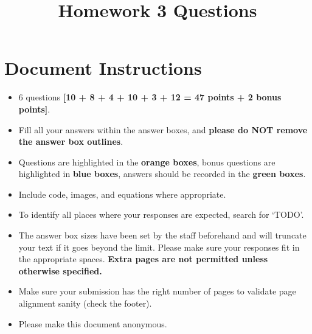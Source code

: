 \pagestyle{fancy}
\fancyhf{}


\date{}

\title{\vspace{-1cm}Homework 3 Questions}



\maketitle
\vspace{-2cm}
\thispagestyle{fancy}

\section*{ Document Instructions}
\begin{itemize}
  \item 6 questions \textbf{[10 + 8 + 4 + 10 + 3 + 12 = 47 points + 2 bonus points]}.
  \item Fill all your answers within the answer boxes, and \textbf{please do NOT remove the answer box outlines}.
  \item Questions are highlighted in the \textbf{orange boxes}, bonus questions are highlighted in \textbf{blue boxes}, answers should be recorded in the \textbf{green boxes}.
  \item Include code, images, and equations where appropriate.
  \item To identify all places where your responses are expected, search for `TODO'.
  \item The answer box sizes have been set by the staff beforehand and will truncate your text if it goes beyond the limit. Please make sure your responses fit in the appropriate spaces. \textbf{Extra pages are not permitted unless otherwise specified.}
  \item Make sure your submission has the right number of pages to validate page alignment sanity (check the footer).
  \item Please make this document anonymous.
\end{itemize}

